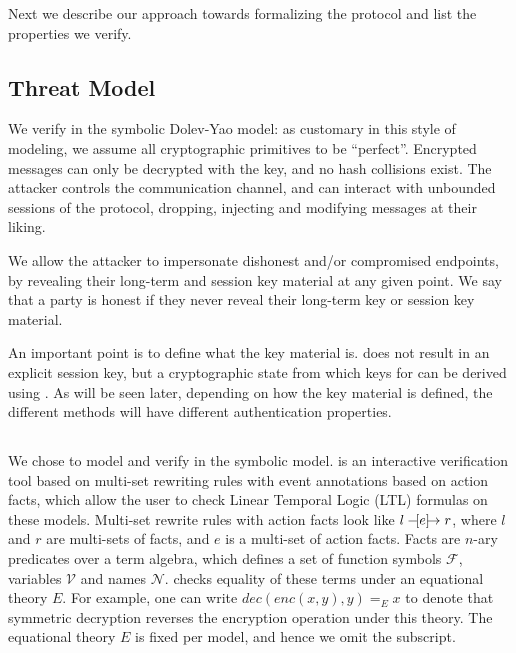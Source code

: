  
Next we describe our approach towards formalizing the \mEdhoc{} protocol and list the properties we verify. %
%
%
\subsection{Threat Model}\label{sec:threat-model}
We verify \mEdhoc{} in the symbolic Dolev-Yao model: as customary in this style of
modeling, we assume all cryptographic primitives to be ``perfect''. Encrypted messages can only be decrypted with the key, and no hash collisions exist. The attacker controls the
 communication channel, and can interact with unbounded sessions of the protocol,
dropping, injecting and modifying messages at their liking.

We allow the attacker to impersonate
dishonest and/or compromised endpoints, by revealing their long-term and session
key material at any given point.
%
We say that a party is honest if they never reveal their
long-term key or session key material.

An important point is to define what the key material is.
    \mEdhoc{} does not result in an explicit session key, but a cryptographic
    state from which keys for \mOscore{} can be derived using \mHkdf.
    As will be seen later, depending on how the key material is defined, the
    different methods will have different authentication properties.

\subsection{\mTamarin{}}
\label{sec:tamarin}
 
We chose \mTamarin{} to model and verify \mEdhoc{} in the symbolic model.
%
\mTamarin{} is an interactive verification tool based on multi-set rewriting rules
with event annotations based on action facts, which allow the user to check
 Linear Temporal Logic (LTL) formulas on these models.
%
Multi-set rewrite rules with action facts look like $ l \ifarrow[e] r $,
where $l$ and $r$ are multi-sets of facts, and $e$ is a multi-set of action facts.
Facts are $n$-ary predicates over a term algebra, which defines a set of function
symbols $\mathcal F$, variables $\mathcal V$ and names $\mathcal N$. \mTamarin{}
checks equality of these terms under an equational theory $E$. For example,
one can write $ dec(enc(x,y),y) =_E x $
to denote that symmetric decryption reverses the encryption operation under this theory.
The equational theory $E$ is fixed per model, and hence we omit the subscript.

